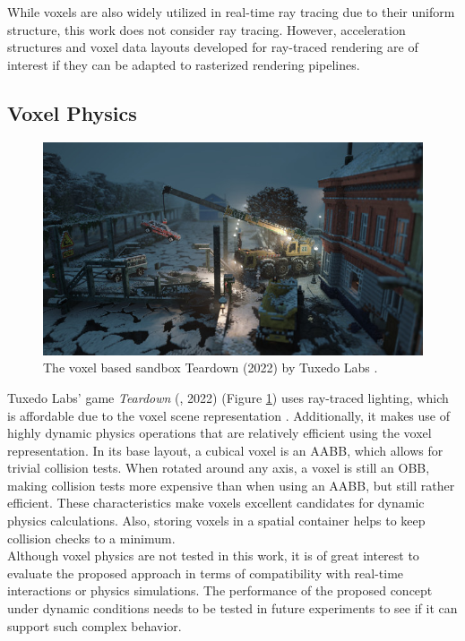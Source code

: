 \noindent
While voxels are also widely utilized in real-time ray tracing due to their uniform structure, this work does 
not consider ray tracing. However, acceleration structures and voxel data layouts developed for ray-traced 
rendering are of interest if they can be adapted to rasterized rendering pipelines.


\subsection*{Voxel Physics} \label{subsec-voxel-physics}

\begin{figure}[h]
    \centering
    \includegraphics[width=\linewidth]{images/graphics/teardown.jpg}
    \caption{The voxel based sandbox Teardown (2022) by Tuxedo Labs \cite{TuxedoLabs2022}.}
    \label{fig:teardown}
\end{figure}

\noindent
Tuxedo Labs' game \emph{Teardown} (\cite{TeardownSteam2022}, 2022) (Figure \ref{fig:teardown}) uses ray-traced 
lighting, which is affordable due to the voxel scene representation \cite{TuxedoLabs2022}. Additionally, 
it makes use of highly dynamic physics operations that are relatively efficient using the voxel representation. 
In its base layout, a cubical voxel is an \ac{AABB}, which allows for trivial collision tests. When rotated 
around any axis, a voxel is still an \ac{OBB}, making collision tests more expensive than when using an \ac{AABB}, 
but still rather efficient. These characteristics make voxels excellent candidates for dynamic physics 
calculations. Also, storing voxels in a spatial container helps to keep collision checks to a minimum. \\

\noindent
Although voxel physics are not tested in this work, it is of great interest to evaluate the proposed approach 
in terms of compatibility with real-time interactions or physics simulations. The performance of the proposed 
concept under dynamic conditions needs to be tested in future experiments to see if it can support such complex 
behavior.

